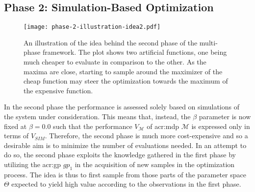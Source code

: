 



\newpage

\subsection{Phase 2: Simulation-Based Optimization}
\label{sec:phase-2}

\begin{figure}[t!]
	\centering
	\texttt{[image: phase-2-illustration-idea2.pdf]}
	\caption{An illustration of the idea behind the second phase of the multi-phase framework. The plot shows two artificial functions, one being much cheaper to evaluate in comparison to the other. As the maxima are close, starting to sample around the maximizer of the cheap function may steer the optimization towards the maximum of the expensive function.}
	\label{fig:phase-2-idea}
\end{figure}

In the second phase the performance is assessed solely based on simulations of the system under consideration.
This means that, instead, the $\beta$ parameter is now fixed at $\beta = 0.0$ such that the performance $V_\mathcal{M}$ of \acrshort{acr:mdp} $\mathcal{M}$ is expressed only in terms of $V_\mathit{SIM}$.
Therefore, the second phase is much more cost-expensive and so a desirable aim is to minimize the number of evaluations needed.
In an attempt to do so, the second phase exploits the knowledge gathered in the first phase by utilizing the \acrshort{acr:gp} $\mathit{gp}_1$ in the acquisition of new samples in the optimization process.
The idea is thus to first sample from those parts of the parameter space $\Theta$ expected to yield high value according to the observations in the first phase.

